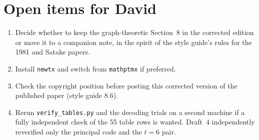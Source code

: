 \documentclass[12pt,letterpaper]{article}
\begin{document}
\section{Open items for David}\label{sec:open}

\begin{enumerate}[leftmargin=*]
\item Decide whether to keep the graph-theoretic Section~8 in the corrected
edition or move it to a companion note, in the spirit of the style guide's
rules for the 1981 and Satake papers.
\item Install \texttt{newtx} and switch from \texttt{mathptmx} if preferred.
\item Check the copyright position before posting this corrected version of
the published paper (style guide 8.6).
\item Rerun \texttt{verify\_tables.py} and the decoding trials on a second
machine if a fully independent check of the 55 table rows is wanted. Draft~4
independently reverified only the principal code and the $t=6$ pair.
\end{enumerate}
\end{document}
